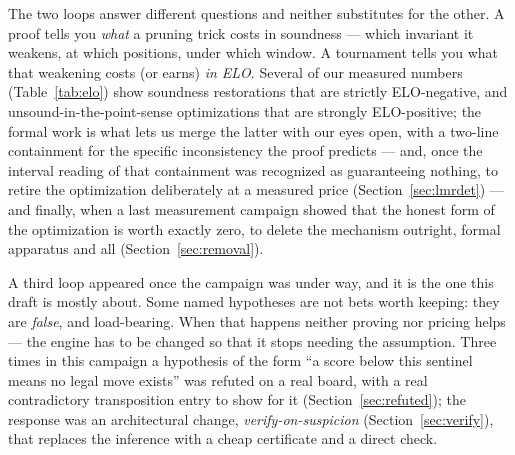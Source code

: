 \documentclass[11pt]{article}
\theoremstyle{plain}
\theoremstyle{definition}
\theoremstyle{remark}
\begin{document}
The two loops answer different questions and neither substitutes for the
other.  A proof tells you \emph{what} a pruning trick costs in
soundness --- which invariant it weakens, at which positions, under
which window.  A tournament tells you what that weakening costs (or
earns) \emph{in ELO}.  Several of our measured numbers
(Table~\ref{tab:elo}) show soundness restorations that are strictly ELO-negative,
and unsound-in-the-point-sense optimizations that are strongly
ELO-positive; the formal work is what lets us merge the latter with our
eyes open, with a two-line containment for the specific inconsistency
the proof predicts --- and, once the interval reading of that
containment was recognized as guaranteeing nothing, to retire the
optimization deliberately at a measured price
(Section~\ref{sec:lmrdet}) --- and finally, when a last measurement
campaign showed that the honest form of the optimization is worth
exactly zero, to delete the mechanism outright, formal apparatus and
all (Section~\ref{sec:removal}).

A third loop appeared once the campaign was under way, and it is the
one this draft is mostly about.  Some named hypotheses are not bets
worth keeping: they are \emph{false}, and load-bearing.  When that
happens neither proving nor pricing helps --- the engine has to be
changed so that it stops needing the assumption.  Three times in this
campaign a hypothesis of the form ``a score below this sentinel means
no legal move exists'' was refuted on a real board, with a real
contradictory transposition entry to show for it
(Section~\ref{sec:refuted}); the response was an architectural change,
\emph{verify-on-suspicion} (Section~\ref{sec:verify}), that replaces
the inference with a cheap certificate and a direct check.
\end{document}
